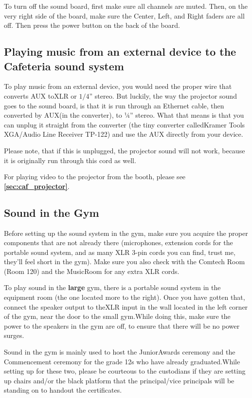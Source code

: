 \documentclass{article}
\begin{document}
To turn off the sound board, first make sure all channels are muted. Then, on the very right side of the board, make sure the Center, Left, and Right faders are all off. Then press the power button on the back of the board.

\subsection{Playing music from an external device to the Cafeteria sound system}

To play music from an external device, you would need the proper wire that converts AUX toXLR or $1/4$” stereo. But luckily, the way the projector sound goes to the sound board, is that it is run through an Ethernet cable, then converted by AUX(in the converter), to ¼” stereo. What that means is that you can unplug it straight from the converter (the tiny converter calledKramer Tools XGA/Audio Line Receiver TP-122) and use the AUX directly from your device.

Please note, that if this is unplugged, the projector sound will not work, because it is originally run through this cord as well.

For playing video to the projector from the booth, please see \textbf{\underline{\ref{sec:caf_projector}}}.

\subsection{Sound in the Gym}
Before setting up the sound system in the gym, make sure you acquire the proper components that are not already there (microphones, extension cords for the portable sound system, and as many XLR 3-pin cords you can find, trust me, they’ll feel short in the gym). Make sure you also check with the Comtech Room (Room 120) and the MusicRoom for any extra XLR cords.

To play sound in the \textbf{large} gym, there is a portable sound system in the equipment room (the one located more to the right). Once you have gotten that, connect the speaker output to theXLR input in the wall located in the left corner of the gym, near the door to the small gym.While doing this, make sure the power to the speakers in the gym are off, to ensure that there will be no power surges.

Sound in the gym is mainly used to host the JuniorAwards ceremony and the Commencement ceremony for the grade 12s who have already graduated.While setting up for these two, please be courteous to the custodians if they are setting up chairs and/or the black platform that the principal/vice principals will be standing on to handout the certificates.
\end{document}
